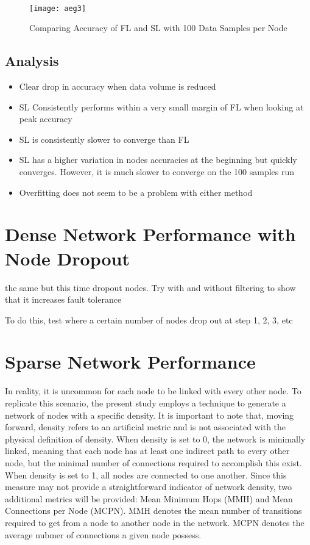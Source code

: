 \begin{figure}[H]
	 \\
	\texttt{[image: aeg3]}
	\caption{Comparing Accuracy of FL and SL with 100 Data Samples per Node}
	\label{aeg3}
\end{figure}

\subsection{Analysis}


\begin{itemize}
	\item Clear drop in accuracy when data volume is reduced
	\item SL Consistently performs within a very small margin of FL when looking at peak accuracy
	\item SL is consistently slower to converge than FL
	\item SL has a higher variation in nodes accuracies at the beginning but quickly converges. However, it is much slower to converge on the 100 samples run
	\item Overfitting does not seem to be a problem with either method
\end{itemize}

\section{Dense Network Performance with Node Dropout}


the same but this time dropout nodes. Try with and without filtering to show that it increases fault tolerance

To do this, test where a certain number of nodes drop out at step 1, 2, 3, etc

\section{Sparse Network Performance}
In reality, it is uncommon for each node to be linked with every other node. To replicate this scenario, the present study employs a technique to generate a network of nodes with a specific density. It is important to note that, moving forward, density refers to an artificial metric and is not associated with the physical definition of density. When density is set to 0, the network is minimally linked, meaning that each node has at least one indirect path to every other node, but the minimal number of connections required to accomplish this exist. When density is set to 1, all nodes are connected to one another. Since this measure may not provide a straightforward indicator of network density, two additional metrics will be provided:  Mean Minimum Hops (MMH) and Mean Connections per Node (MCPN). MMH denotes the mean number of transitions required to get from a node to another node in the network. MCPN denotes the average nubmer of connections a given node possess.

